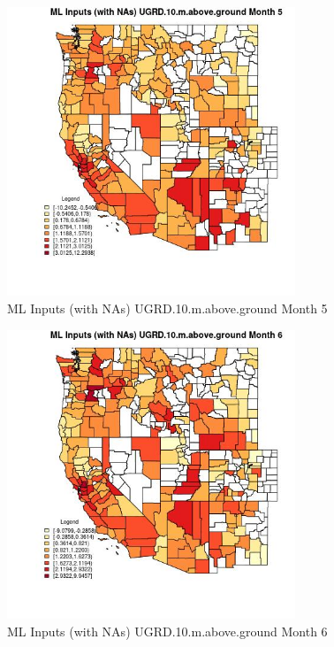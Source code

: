 \begin{figure} 
\centering  
\includegraphics[width=0.77\textwidth]{Code_Outputs/Report_ML_input_PM25_Step4_part_e_de_duplicated_aves_compiled_2019-05-21wNAs_CountyUGRD10mabovegroundmedianMonth5.jpg} 
\caption{\label{fig:Report_ML_input_PM25_Step4_part_e_de_duplicated_aves_compiled_2019-05-21wNAsCountyUGRD10mabovegroundmedianMonth5}ML Inputs (with NAs) UGRD.10.m.above.ground Month 5} 
\end{figure} 
 

\begin{figure} 
\centering  
\includegraphics[width=0.77\textwidth]{Code_Outputs/Report_ML_input_PM25_Step4_part_e_de_duplicated_aves_compiled_2019-05-21wNAs_CountyUGRD10mabovegroundmedianMonth6.jpg} 
\caption{\label{fig:Report_ML_input_PM25_Step4_part_e_de_duplicated_aves_compiled_2019-05-21wNAsCountyUGRD10mabovegroundmedianMonth6}ML Inputs (with NAs) UGRD.10.m.above.ground Month 6} 
\end{figure} 
 

